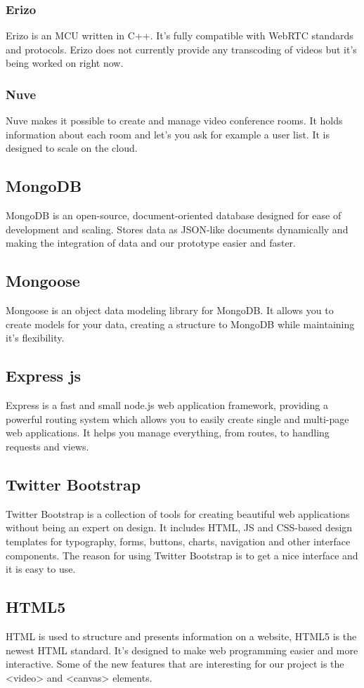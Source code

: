 \documentclass[12pt, titlepage]{article}
\begin{document}
\subsubsection{Erizo}
Erizo is an MCU written in C++. It’s fully compatible with WebRTC standards and protocols. Erizo does not currently provide any transcoding of videos but it’s being worked on right now. 
\subsubsection{Nuve}
Nuve makes it possible to create and manage video conference rooms. It holds information about each room and let’s you ask for example a user list. It is designed to scale on the cloud.
\subsection{MongoDB}
MongoDB is an open-source, document-oriented database designed for ease of development and scaling. Stores data as JSON-like documents dynamically and making the integration of data and our prototype easier and faster.
\subsection{Mongoose}
Mongoose is an object data modeling library for MongoDB. It allows you to create models for your data, creating a structure to MongoDB while maintaining it’s flexibility.
\subsection{Express js}
Express is a fast and small node.js web application framework, providing a powerful routing system which allows you to easily create single and multi-page web applications. It helps you manage everything, from routes, to handling requests and views.
\subsection{Twitter Bootstrap}
Twitter Bootstrap is a collection of tools for creating beautiful web applications without being an expert on design. It includes HTML, JS and CSS-based design templates for typography, forms, buttons, charts, navigation and other interface components. The reason for using Twitter Bootstrap is to get a nice interface and it is easy to use.
\subsection{HTML5}
HTML is used to structure and presents information on a website, HTML5 is the newest HTML standard. It’s designed to make web programming easier and more interactive. Some of the new features that are interesting for our project is the <video> and <canvas> elements.
\end{document}
